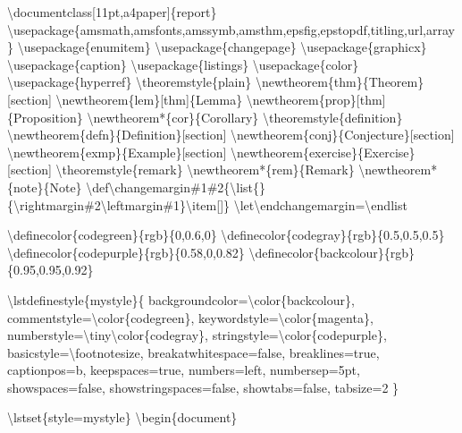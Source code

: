\textbackslash{}documentclass[11pt,a4paper]\{report\}
\textbackslash{}usepackage\{amsmath,amsfonts,amssymb,amsthm,epsfig,epstopdf,titling,url,array\}
\textbackslash{}usepackage\{enumitem\}
\textbackslash{}usepackage\{changepage\}
\textbackslash{}usepackage\{graphicx\}
\textbackslash{}usepackage\{caption\}
\textbackslash{}usepackage\{listings\}
\textbackslash{}usepackage\{color\}
\textbackslash{}usepackage\{hyperref\}
\textbackslash{}theoremstyle\{plain\}
\textbackslash{}newtheorem\{thm\}\{Theorem\}[section]
\textbackslash{}newtheorem\{lem\}[thm]\{Lemma\}
\textbackslash{}newtheorem\{prop\}[thm]\{Proposition\}
\textbackslash{}newtheorem*\{cor\}\{Corollary\}
\textbackslash{}theoremstyle\{definition\}
\textbackslash{}newtheorem\{defn\}\{Definition\}[section]
\textbackslash{}newtheorem\{conj\}\{Conjecture\}[section]
\textbackslash{}newtheorem\{exmp\}\{Example\}[section]
\textbackslash{}newtheorem\{exercise\}\{Exercise\}[section]
\textbackslash{}theoremstyle\{remark\}
\textbackslash{}newtheorem*\{rem\}\{Remark\}
\textbackslash{}newtheorem*\{note\}\{Note\}
\textbackslash{}def\textbackslash{}changemargin\#1\#2\{\textbackslash{}list\{\}\{\textbackslash{}rightmargin\#2\textbackslash{}leftmargin\#1\}\textbackslash{}item[]\}
\textbackslash{}let\textbackslash{}endchangemargin=\textbackslash{}endlist 

\textbackslash{}definecolor\{codegreen\}\{rgb\}\{0,0.6,0\}
\textbackslash{}definecolor\{codegray\}\{rgb\}\{0.5,0.5,0.5\}
\textbackslash{}definecolor\{codepurple\}\{rgb\}\{0.58,0,0.82\}
\textbackslash{}definecolor\{backcolour\}\{rgb\}\{0.95,0.95,0.92\}

\textbackslash{}lstdefinestyle\{mystyle\}\{
backgroundcolor=\textbackslash{}color\{backcolour\},   
commentstyle=\textbackslash{}color\{codegreen\},
keywordstyle=\textbackslash{}color\{magenta\},
numberstyle=\textbackslash{}tiny\textbackslash{}color\{codegray\},
stringstyle=\textbackslash{}color\{codepurple\},
basicstyle=\textbackslash{}footnotesize,
breakatwhitespace=false,         
breaklines=true,                 
captionpos=b,                    
keepspaces=true,                 
numbers=left,                    
numbersep=5pt,                  
showspaces=false,                
showstringspaces=false,
showtabs=false,                  
tabsize=2
\}

\textbackslash{}lstset\{style=mystyle\}
\textbackslash{}begin\{document\}


